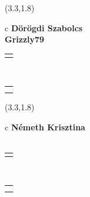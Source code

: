 \documentclass[11pt]{article}
\begin{document}
\makebox(3.3,1.8){
  \renewcommand\arraystretch{1.3}
  \begin{tabular}[c]{c}
    \hspace{8.5mm}
    \LARGE\bf{ Dörögdi Szabolcs }\\
    \hspace{8.5mm}
    \Large{ Grizzly79 }\\
    \renewcommand\arraystretch{3}
    \begin{tabular}[c]{c}
      \centering
      \fontfamily{phv}\selectfont{
        \textbf{
          \textsc{
            \scriptsize{
            \color{Dark}{ Ismerkedő }\color{Dark}{ Webmester }\color{Bright}{ Sminkmester }\color{Bright}{ Programozó }
            }
          }
        }
      }
    \end{tabular}
    \\
    \renewcommand\arraystretch{1}
    \begin{tabular}{p{3.3in}}
      \hspace{.7cm}\\
      \hspace{.7cm}\emph{  }\\
    \end{tabular}
  \end{tabular}
}

\makebox(3.3,1.8){
  \renewcommand\arraystretch{1.3}
  \begin{tabular}[c]{c}
    \hspace{8.5mm}
    \LARGE\bf{ Németh Krisztina }\\
    \hspace{8.5mm}
    \Large{  }\\
    \renewcommand\arraystretch{3}
    \begin{tabular}[c]{c}
      \centering
      \fontfamily{phv}\selectfont{
        \textbf{
          \textsc{
            \scriptsize{
            \color{Dark}{ Ismerkedő }\color{Bright}{ Webmester }\color{Bright}{ Sminkmester }\color{Bright}{ Programozó }
            }
          }
        }
      }
    \end{tabular}
    \\
    \renewcommand\arraystretch{1}
    \begin{tabular}{p{3.3in}}
      \hspace{.7cm}\\
      \hspace{.7cm}\emph{  }\\
    \end{tabular}
  \end{tabular}
}
\end{document}
